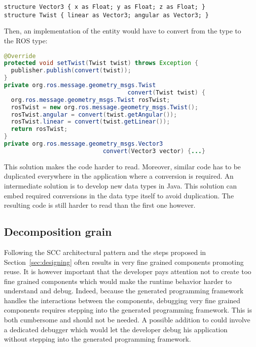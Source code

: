 \begin{lstlisting}[language=diaspec, numbers=none]
structure Vector3 { x as Float; y as Float; z as Float; }
structure Twist { linear as Vector3; angular as Vector3; }
\end{lstlisting}

Then, an implementation of the  entity would have to convert
from the \diaspec{}  type to the ROS  type:

\begin{lstlisting}[language=java, numbers=none]
@Override
protected void setTwist(Twist twist) throws Exception {
  publisher.publish(convert(twist));
}
private org.ros.message.geometry_msgs.Twist
                                   convert(Twist twist) {
  org.ros.message.geometry_msgs.Twist rosTwist;
  rosTwist = new org.ros.message.geometry_msgs.Twist();
  rosTwist.angular = convert(twist.getAngular());
  rosTwist.linear = convert(twist.getLinear());
  return rosTwist;
}
private org.ros.message.geometry_msgs.Vector3
                            convert(Vector3 vector) {...}
\end{lstlisting}

This solution makes the code harder to read. Moreover, similar code
has to be duplicated everywhere in the application where a conversion
is required. An intermediate solution is to develop new data types in
Java. This solution can embed required conversions in the data type
itself to avoid duplication. The resulting code is still harder to
read than the first one however.

\subsection{Decomposition grain}

Following the SCC architectural pattern and the steps proposed in
Section~\ref{sec:designing} often results in very fine grained
components promoting reuse. It is however important that the developer
pays attention not to create too fine grained components which would
make the runtime behavior harder to understand and debug. Indeed,
because the generated programming framework handles the interactions
between the components, debugging very fine grained components
requires stepping into the generated programming framework. This is
both cumbersome and should not be needed. A possible addition to
\diaspec{} could involve a dedicated debugger which would let the
developer debug his application without stepping into the generated
programming framework.



